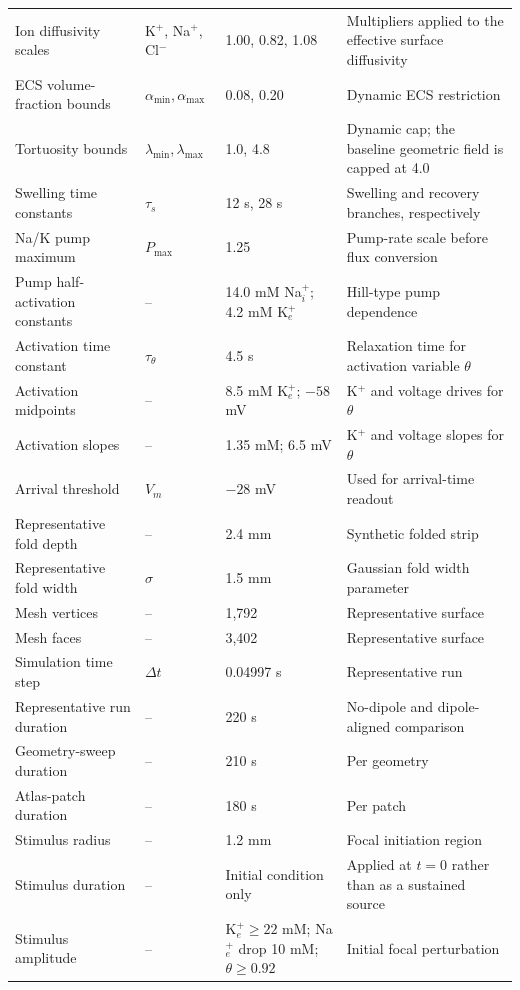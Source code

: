 \documentclass[12pt]{article}
\begin{document}
\begin{table}[t]
{\begin{tabular}{@{}llll@{}}
Ion diffusivity scales & K$^+$, Na$^+$, Cl$^-$ & 1.00, 0.82, 1.08 & Multipliers applied to the effective surface diffusivity \\
ECS volume-fraction bounds & $\alpha_{\min},\alpha_{\max}$ & 0.08, 0.20 & Dynamic ECS restriction \\
Tortuosity bounds & $\lambda_{\min},\lambda_{\max}$ & 1.0, 4.8 & Dynamic cap; the baseline geometric field is capped at 4.0 \\
Swelling time constants & $\tau_s$ & 12 s, 28 s & Swelling and recovery branches, respectively \\
Na/K pump maximum & $P_{\max}$ & 1.25 & Pump-rate scale before flux conversion \\
Pump half-activation constants & -- & 14.0 mM Na$^+_i$; 4.2 mM K$^+_e$ & Hill-type pump dependence \\
Activation time constant & $\tau_{\theta}$ & 4.5 s & Relaxation time for activation variable $\theta$ \\
Activation midpoints & -- & 8.5 mM K$^+_e$; $-58$ mV & K$^+$ and voltage drives for $\theta$ \\
Activation slopes & -- & 1.35 mM; 6.5 mV & K$^+$ and voltage slopes for $\theta$ \\
Arrival threshold & $V_m$ & $-28$ mV & Used for arrival-time readout \\
Representative fold depth & -- & 2.4 mm & Synthetic folded strip \\
Representative fold width & $\sigma$ & 1.5 mm & Gaussian fold width parameter \\
Mesh vertices & -- & 1,792 & Representative surface \\
Mesh faces & -- & 3,402 & Representative surface \\
Simulation time step & $\Delta t$ & 0.04997 s & Representative run \\
Representative run duration & -- & 220 s & No-dipole and dipole-aligned comparison \\
Geometry-sweep duration & -- & 210 s & Per geometry \\
Atlas-patch duration & -- & 180 s & Per patch \\
Stimulus radius & -- & 1.2 mm & Focal initiation region \\
Stimulus duration & -- & Initial condition only & Applied at $t=0$ rather than as a sustained source \\
Stimulus amplitude & -- & K$^+_e\geq 22$ mM; Na$^+_e$ drop 10 mM; $\theta\geq0.92$ & Initial focal perturbation \\
\bottomrule
\end{tabular}
}
\endgroup
\end{table}
\end{document}
